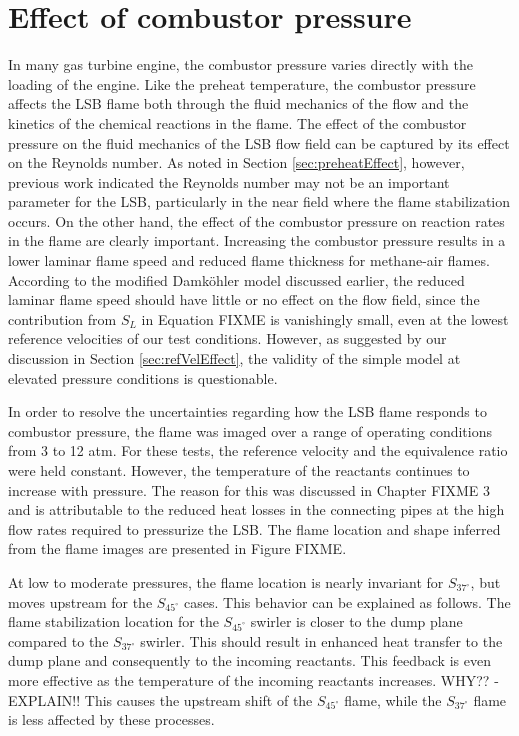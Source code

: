 \section{Effect of combustor pressure}

In many gas turbine engine, the combustor pressure varies directly with the loading of the engine.
Like the preheat temperature, the combustor pressure affects the LSB flame both through the fluid mechanics of the flow and the kinetics of the chemical reactions in the flame.
The effect of the combustor pressure on the fluid mechanics of the LSB flow field can be captured by its effect on the Reynolds number.
As noted in Section \ref{sec:preheatEffect}, however, previous work indicated the Reynolds number may not be an important parameter for the LSB, particularly in the near field where the flame stabilization occurs. 
On the other hand, the effect of the combustor pressure on reaction rates in the flame are clearly important.
Increasing the combustor pressure results in a lower laminar flame speed and reduced flame thickness for methane-air flames.
According to the modified Damk\"ohler model discussed earlier, the reduced laminar flame speed should have little or no effect on the flow field, since the contribution from \(S_L\) in Equation FIXME is vanishingly small, even at the lowest reference velocities of our test conditions.
However, as suggested by our discussion in Section \ref{sec:refVelEffect}, the validity of the simple model at elevated pressure conditions is questionable.

In order to resolve the uncertainties regarding how the LSB flame responds to combustor pressure, the flame was imaged over a range of operating conditions from 3 to 12 atm.
For these tests, the reference velocity and the equivalence ratio were held constant.
However, the temperature of the reactants continues to increase with pressure.
The reason for this was discussed in Chapter FIXME 3 and is attributable to the reduced heat losses in the connecting pipes at the high flow rates required to pressurize the LSB.
The flame location and shape inferred from the flame images are presented in Figure FIXME.

At low to moderate pressures, the flame location is nearly invariant for \(S_{37^\circ}\), but moves upstream for the \(S_{45^\circ}\) cases.
This behavior can be explained as follows.
The flame stabilization location for the \(S_{45^\circ}\) swirler is closer to the dump plane compared to the \(S_{37^\circ}\) swirler.
This should result in enhanced heat transfer to the dump plane and consequently to the incoming reactants.
This feedback is even more effective as the temperature of the incoming reactants increases. WHY?? - EXPLAIN!!
This causes the upstream shift of the \(S_{45^\circ}\) flame, while the \(S_{37^\circ}\) flame is less affected by these processes.


